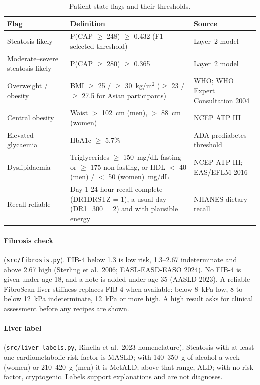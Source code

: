 \begin{table}[htbp]
\centering
\footnotesize
\caption{Patient-state flags and their thresholds.}
\label{tab:a_flags}
\begin{tabularx}{\textwidth}{>{\raggedright\arraybackslash}p{3.4cm}L>{\raggedright\arraybackslash}p{3.6cm}}
\toprule
Flag & Definition & Source \\
\midrule
Steatosis likely & P(CAP $\geq$ 248) $\geq$ 0.432 (F1-selected threshold) & Layer~2 model \\
Moderate--severe steatosis likely & P(CAP $\geq$ 280) $\geq$ 0.365 & Layer~2 model \\
Overweight / obesity & BMI $\geq$ 25 / $\geq$ 30~kg/m$^2$ ($\geq$ 23 / $\geq$ 27.5 for Asian participants) & WHO; WHO Expert Consultation 2004 \\
Central obesity & Waist $>$ 102~cm (men), $>$ 88~cm (women) & NCEP ATP III \\
Elevated glycaemia & HbA1c $\geq$ 5.7\% & ADA prediabetes threshold \\
Dyslipidaemia & Triglycerides $\geq$ 150~mg/dL fasting or $\geq$ 175 non-fasting, or HDL $<$ 40 (men) / $<$ 50 (women)~mg/dL & NCEP ATP III; EAS/EFLM 2016 \\
Recall reliable & Day-1 24-hour recall complete (DR1DRSTZ = 1), a usual day (DR1\_300 = 2) and with plausible energy & NHANES dietary recall \\
\bottomrule
\end{tabularx}
\end{table}

\paragraph{Fibrosis check} (\nolinkurl{src/fibrosis.py}). FIB-4 below 1.3 is low
risk, 1.3--2.67 indeterminate and above 2.67 high (Sterling et al.\ 2006;
EASL-EASD-EASO 2024). No FIB-4 is given under age 18, and a note is added
under age 35 (AASLD 2023). A reliable FibroScan liver stiffness replaces FIB-4
when available: below 8~kPa low, 8 to below 12~kPa indeterminate, 12~kPa or
more high. A high result asks for clinical assessment before any recipes are
shown.

\paragraph{Liver label} (\nolinkurl{src/liver_labels.py}, Rinella et al.\ 2023
nomenclature). Steatosis with at least one cardiometabolic risk factor is
MASLD; with 140--350~g of alcohol a week (women) or 210--420~g (men) it is
MetALD; above that range, ALD; with no risk factor, cryptogenic. Labels support
explanations and are not diagnoses.

